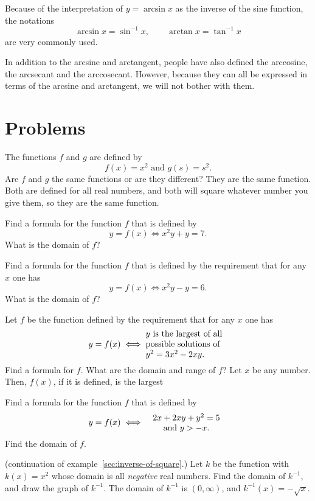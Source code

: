 Because of the interpretation of $y=\arcsin x$ as the inverse of the sine
function, the notations
\[
\arcsin x = \sin^{-1} x,\qquad \arctan x = \tan^{-1} x
\]
are very commonly used.

In addition to the arcsine and arctangent, people have also defined the
arccosine, the arcsecant and the arccosecant.  However, because they can all be
expressed in terms of the arcsine and arctangent, we will not bother with them.

\section{Problems}
\problemfont%

\begin{multicols}{2}\setlength{\parindent}{0pt}
\problem The functions $f$ and $g$ are defined by 
\[
    f(x) = x^2 \text{ and } g(s) = s^2.
\]
Are $f$ and $g$ the same functions or are they different?
\answer 
  They are the same function.  Both are defined for all real numbers,
  and both will square whatever number you give them, so they are the
  same function.
\endanswer


\problem Find a formula for the function $f$ that is defined by 
\[
  y=f(x) \iff x^2y+y = 7.
\]
What is the domain of $f$?


\problem Find a formula for the function $f$ that is defined by the 
requirement that for any $x$ one has
\[
  y=f(x) \iff x^2y-y = 6.
\]
What is the domain of $f$?


\problem Let $f$ be the function defined by the requirement that for 
any $x$ one has
\[
  y=f(x) \iff \parbox{96pt}{\raggedright$y$ is the largest of all\\
  possible solutions of\\ $y^2 = 3x^2-2xy$.}
\]
Find a formula for $f$.  What are the domain and range of $f$?
\answer 
Let $x$ be any number.  Then, $f(x)$, if it is defined, is the largest

\endanswer


\problem Find a formula for the function $f$ that is defined by 
\[
  y=f(x) \iff
  \parbox{96pt}{\centering$2x+2xy+y^2 = 5$\\ and  $y>-x$.}
\]
Find the domain of $f$.

\problem\label{ex:inverse-of-square} 
(continuation of example~\ref{sec:inverse-of-square}.)
Let $k$ be the function with $k(x) = x^2$ whose domain is all \textit{negative}
real numbers. Find the domain of $k^{-1}$, and draw the graph of $k^{-1}$.
\answer 
The domain of $k^{-1} $ is $(0, \infty)$, and $k^{-1}(x) = -\sqrt{x}$.
\endanswer


\end{multicols}
